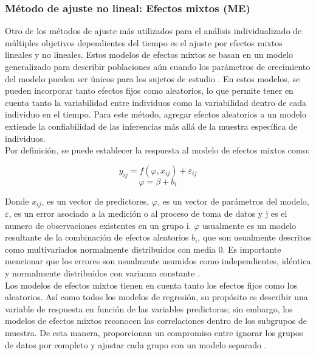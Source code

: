 \subsubsection{Método de ajuste no lineal: Efectos mixtos (ME)}

Otro de los métodos de ajuste más utilizados para el análisis individualizado de múltiples objetivos dependientes del tiempo es el ajuste por efectos mixtos lineales y no lineales. Estos modelos de efectos mixtos se basan en un modelo generalizado para describir poblaciones aún cuando los parámetros de crecimiento del modelo pueden ser únicos para los sujetos de estudio \cite{mixedShelley}. En estos modelos, se pueden incorporar tanto efectos fijos como aleatorios, lo que permite tener en cuenta tanto la variabilidad entre individuos como la variabilidad dentro de cada individuo en el tiempo. Para este método, agregar efectos aleatorios a un modelo extiende la confiabilidad de las inferencias más allá de la muestra específica de individuos. \\

Por definición, se puede establecer la respuesta al modelo de efectos mixtos como:

\begin{equation}
    y_{ij} = f(\varphi,x_{ij}) + \varepsilon_{ij}
\end{equation}
\begin{equation}
    \varphi = \beta + b_{i}
\end{equation}

Donde $x_{ij}$, es un vector de predictores, $\varphi$, es un vector de parámetros del modelo, $\varepsilon$, es un error asociado a la medición o al proceso de toma de datos y j es el numero de observaciones existentes en un grupo i. $\varphi$ usualmente es un modelo resultante de la combinación de efectos aleatorios $b_{i}$, que son usualmente descritos como multivariados normalmente distribuidos con media 0. Es importante mencionar que los errores son usualmente asumidos como independientes, idéntica y normalmente distribuidos con varianza constante \cite{matlabmixed}.\\

Los modelos de efectos mixtos tienen en cuenta tanto los efectos fijos como los aleatorios. Así como todos los modelos de regresión, su propósito es describir una variable de respuesta en función de las variables predictoras; sin embargo, los modelos de efectos mixtos reconocen las correlaciones dentro de los subgrupos de muestra. %
De esta manera, proporcionan un compromiso entre ignorar los grupos de datos por completo y ajustar cada grupo con un modelo separado \cite{matlabmixed}. 




